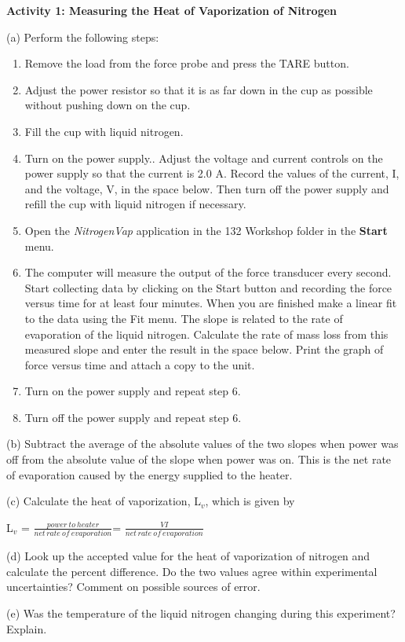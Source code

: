 \textbf{Activity 1: Measuring the Heat of Vaporization of Nitrogen}

(a) Perform the following steps:

\begin{enumerate}
\item Remove the load from the force probe and press the TARE button.
\item Adjust the power resistor so that it is as far down in the cup as
possible without pushing down on the cup.
\item Fill the cup with liquid nitrogen.
\item Turn on the power supply.. Adjust the voltage and
current controls on the power supply so that the current is
2.0 A. Record the values of the current, I, and the voltage, V,
in the space below. Then turn off the power supply and refill the
cup with liquid nitrogen if necessary.\vspace{1in}

\item Open the \textit{NitrogenVap} application in the 132 Workshop folder
in the {\bf Start} menu.
\item The computer will measure the output of the force transducer every
second. Start collecting data by clicking on the Start button and
recording the force versus time for at least four minutes. When you
are finished make a linear fit to the data using the Fit menu. The
slope is related to the rate of evaporation of the liquid nitrogen.
Calculate the rate of mass loss from this measured slope and enter
the result in the space below. Print the graph of force versus time
and attach a copy to the unit. \vspace{0.75in}

\item Turn on the power supply and repeat step 6.
\item Turn off the power supply and repeat step 6.
\end{enumerate}
(b) Subtract the average of the absolute values of the two slopes
when power was off from the absolute value of the slope when power
was on. This is the net rate of evaporation caused by the energy supplied
to the heater.

(c) Calculate the heat of vaporization, L\( _{v} \), which is given
by

{\centering L\( _{v} \) = \( \frac{power\: to\: heater}{net\, rate\: of\: evaporation} \)=
\( \frac{VI}{net\, rate\: of\: evaporation} \)\par}
\vspace{30mm}

(d) Look up the accepted value for the heat of vaporization of nitrogen
and calculate the percent difference. Do the two values agree within
experimental uncertainties? Comment on possible sources of error.
\vspace{20mm}

(e) Was the temperature of the liquid nitrogen changing during this
experiment? Explain.
